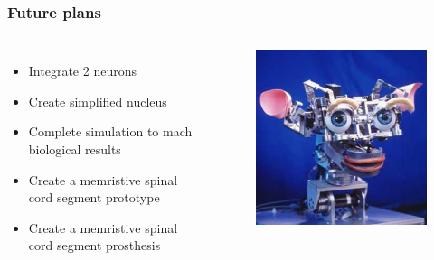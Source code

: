 \documentclass[12pt, aspectratio=169]{beamer}
\begin{document}
\begin{frame}
  \frametitle{Future plans}
\begin{columns}[c]

\begin{itemize}
\item Integrate 2 neurons
\item Create simplified nucleus
\item Complete simulation to mach biological results
\item Create a memristive spinal cord segment prototype
\item Create a memristive spinal cord segment prosthesis
\end{itemize}

\begin{figure}
\includegraphics[width=1.0\linewidth]{Kismet_312}
\end{figure}
\end{columns}
\end{frame}
\end{document}
